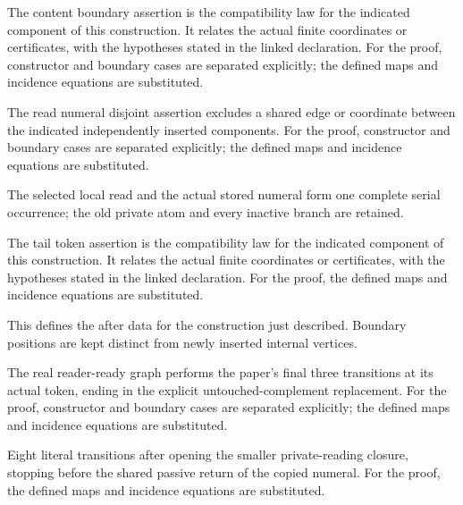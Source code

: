 The content boundary assertion is the compatibility law for the indicated component of this construction. It relates the actual finite coordinates or certificates, with the hypotheses stated in the linked declaration.
For the proof, constructor and boundary cases are separated explicitly; the defined maps and incidence equations are substituted.
\par{}

The read numeral disjoint assertion excludes a shared edge or coordinate between the indicated independently inserted components.
For the proof, constructor and boundary cases are separated explicitly; the defined maps and incidence equations are substituted.
\par{}

The selected local read and the actual stored numeral form one complete serial occurrence; the old private atom and every inactive branch are retained.
\par{}

The tail token assertion is the compatibility law for the indicated component of this construction. It relates the actual finite coordinates or certificates, with the hypotheses stated in the linked declaration.
For the proof, the defined maps and incidence equations are substituted.
\par{}

This defines the after data for the construction just described. Boundary positions are kept distinct from newly inserted internal vertices.
\par{}

The real reader-ready graph performs the paper's final three transitions at its actual token, ending in the explicit untouched-complement replacement.
For the proof, constructor and boundary cases are separated explicitly; the defined maps and incidence equations are substituted.
\par{}

Eight literal transitions after opening the smaller private-reading closure, stopping before the shared passive return of the copied numeral.
For the proof, the defined maps and incidence equations are substituted.
\par{}

